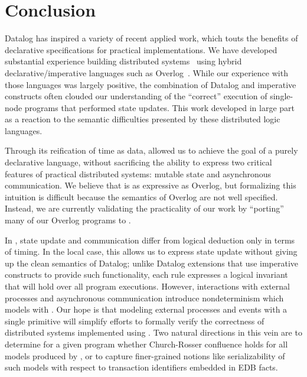 \section{Conclusion}
Datalog has inspired a variety of recent applied work, which touts the benefits
of declarative specifications for practical implementations.  We have developed
substantial experience building distributed
systems~\cite{boom-eurosys,Alvaro2009I-Do-Declare:-C,Chu:2007,Loo2009-CACM}
using hybrid declarative/imperative languages such as
Overlog~\cite{Loo2009-CACM}.  While our experience with those languages was
largely positive, the combination of Datalog and imperative constructs often
clouded our understanding of the ``correct'' execution of single-node programs
that performed state updates.  This work developed in large part as a reaction
to the semantic difficulties presented by these distributed logic languages.

Through its reification of time as data, \lang allowed us to achieve the goal of
a purely declarative language, without sacrificing the ability to express
two critical features of practical distributed systems: mutable state and
asynchronous communication. We believe that \lang is as expressive as Overlog,
but formalizing this intuition is difficult because the semantics of Overlog are
not well specified.  Instead, we are currently validating the practicality of
our work by ``porting'' many of our Overlog programs to \lang.

In \lang, state update and communication differ from logical deduction only in
terms of timing.  In the local case, this allows us to express state update
without giving up the clean semantics of Datalog; unlike Datalog extensions that
use imperative constructs to provide such functionality, each \lang rule
expresses a logical invariant that will hold over all program executions.
However, interactions with external processes and asynchronous communication
introduce nondeterminism which \lang models with .  Our hope is
that modeling external processes and events with a single primitive will
simplify efforts to formally verify the correctness of distributed systems
implemented using \lang. Two natural directions in this vein are to determine
for a given \lang program whether Church-Rosser confluence holds for all models
produced by , or to capture finer-grained notions like
serializability of such models with respect to transaction identifiers embedded
in EDB facts.
